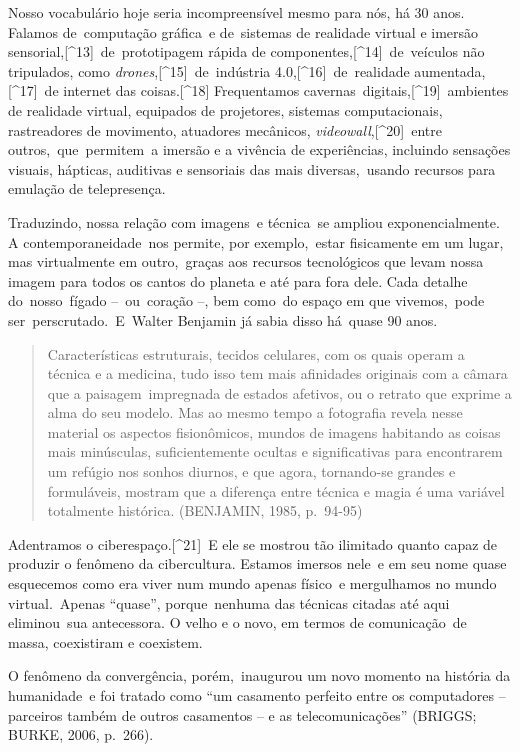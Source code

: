 \documentclass[
  letterpaper,
]{scrbook}
\begin{document}
Nosso vocabulário hoje seria incompreensível mesmo para nós, há 30 anos.
Falamos de~computação gráfica~e de~sistemas de realidade virtual e
imersão sensorial,{[}\^{}13{]}~de~prototipagem rápida de
componentes,{[}\^{}14{]}~de~veículos não tripulados, como
\emph{drones},{[}\^{}15{]}~de~indústria 4.0,{[}\^{}16{]}~de~realidade
aumentada,{[}\^{}17{]}~de internet das coisas.{[}\^{}18{]} Frequentamos
cavernas~digitais,{[}\^{}19{]}~ambientes de realidade virtual, equipados
de projetores, sistemas computacionais, rastreadores de movimento,
atuadores mecânicos, \emph{videowall},{[}\^{}20{]}~entre
outros,~que~permitem~a imersão e a vivência de experiências, incluindo
sensações visuais, hápticas, auditivas e sensoriais das mais
diversas,~usando recursos para emulação de telepresença.

Traduzindo, nossa relação com imagens~e técnica~se ampliou
exponencialmente. A contemporaneidade~nos permite, por exemplo,~estar
fisicamente em um lugar, mas virtualmente em outro,~graças aos recursos
tecnológicos que levam nossa imagem para todos os cantos do planeta e
até para fora dele. Cada detalhe do~nosso~fígado --~ou~coração --, bem
como~do espaço em que vivemos,~pode ser~perscrutado.~E~Walter Benjamin
já sabia disso há~quase 90 anos.~ ~

\begin{quote}
Características estruturais, tecidos celulares, com os quais operam a
técnica e a medicina, tudo isso tem mais afinidades originais com a
câmara que a paisagem~impregnada de estados afetivos, ou o retrato que
exprime a alma do seu modelo. Mas ao mesmo tempo a fotografia revela
nesse material os aspectos fisionômicos, mundos de imagens habitando as
coisas mais minúsculas, suficientemente ocultas e significativas para
encontrarem um refúgio nos sonhos diurnos, e que agora, tornando-se
grandes e formuláveis, mostram que a diferença entre técnica e magia é
uma variável totalmente histórica. (BENJAMIN, 1985, p.~94-95)~ ~
\end{quote}

Adentramos o ciberespaço.{[}\^{}21{]}~E ele se mostrou tão ilimitado
quanto capaz de produzir o fenômeno da cibercultura. Estamos imersos
nele~e em seu nome quase esquecemos como era viver num mundo apenas
físico~e mergulhamos no mundo virtual.~Apenas ``quase'', porque~nenhuma
das técnicas citadas até aqui eliminou~sua antecessora. O velho e o
novo, em termos de comunicação~de massa, coexistiram e coexistem.

O fenômeno da convergência, porém,~inaugurou um novo momento na história
da humanidade~e foi tratado como ``um casamento perfeito entre os
computadores -- parceiros também de outros casamentos -- e as
telecomunicações'' (BRIGGS; BURKE, 2006, p.~266).~
\end{document}
